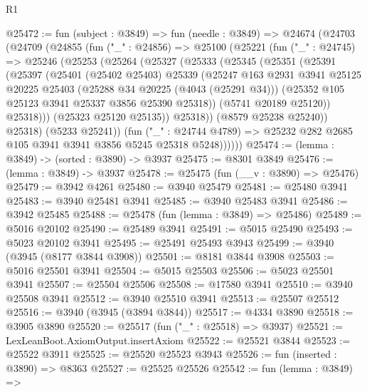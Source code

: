 \begin{lexlean}{R1}
\begin{coremodule}
@25472 := fun (subject : @3849) =>
  fun (needle : @3849) =>
  @24674
    (@24703
      (@24709
        (@24855
          (fun ("_" : @24856) =>
          @25100
            (@25221
              (fun ("_" : @24745) =>
              @25246
                (@25253
                  (@25264
                    (@25327
                      (@25333
                        (@25345
                          (@25351
                            (@25391
                              (@25397
                                (@25401
                                  (@25402 @25403)
                                  @25339
                                  (@25247
                                    @163
                                    @2931
                                    @3941
                                    @25125
                                    @20225
                                    @25403
                                    (@25288 @34 @20225 (@4043 (@25291 @34)))
                                    (@25352 @105 @25123 @3941 @25337 @3856 @25390 @25318))
                                  (@5741 @20189 @25120))
                                @25318)))
                          (@25323 @25120 @25135))
                        @25318))
                    (@8579 @25238 @25240))
                  @25318)
                (@5233 @25241))
              (fun ("_" : @24744 @4789) =>
              @25232 @282 @2685 @105 @3941 @3941 @3856 @5245 @25318 @5248))))))
@25474 := (lemma : @3849) -> (sorted : @3890) -> @3937
@25475 := @8301 @3849
@25476 := (lemma : @3849) -> @3937
@25478 := @25475 (fun (__v : @3890) => @25476)
@25479 := @3942 @4261
@25480 := @3940 @25479
@25481 := @25480 @3941
@25483 := @3940 @25481 @3941
@25485 := @3940 @25483 @3941
@25486 := @3942 @25485
@25488 := @25478 (fun (lemma : @3849) => @25486)
@25489 := @5016 @20102
@25490 := @25489 @3941
@25491 := @5015 @25490
@25493 := @5023 @20102 @3941
@25495 := @25491 @25493 @3943
@25499 := @3940 (@3945 (@8177 @3844 @3908))
@25501 := @8181 @3844 @3908
@25503 := @5016 @25501 @3941
@25504 := @5015 @25503
@25506 := @5023 @25501 @3941
@25507 := @25504 @25506
@25508 := @17580 @3941
@25510 := @3940 @25508 @3941
@25512 := @3940 @25510 @3941
@25513 := @25507 @25512
@25516 := @3940 (@3945 (@3894 @3844))
@25517 := @4334 @3890
@25518 := @3905 @3890
@25520 := @25517 (fun ("_" : @25518) => @3937)
@25521 := LexLeanBoot.AxiomOutput.insertAxiom
@25522 := @25521 @3844
@25523 := @25522 @3911
@25525 := @25520 @25523 @3943
@25526 := fun (inserted : @3890) => @8363
@25527 := @25525 @25526
@25542 := fun (lemma : @3849) =>

\end{coremodule}
\end{lexlean}
